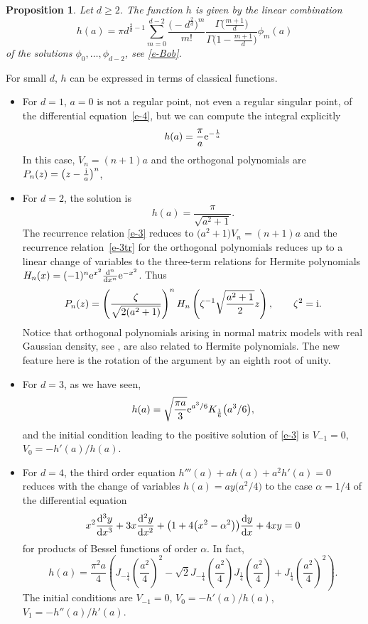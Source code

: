 \documentclass[pdftex]{sigma}
\numberwithin{equation}{section}
\newtheorem{Proposition}[Theorem]{Proposition}
\theoremstyle{definition}
\begin{document}
\begin{Proposition} Let $d\geq2$. The function $h$ is given by the linear combination
\[
 h(a)=\pi d^{\frac2d-1}\sum_{m=0}^{d-2}\frac{\bigl(-d^{\frac2d}\bigr)^m}{m!}
 \frac{\Gamma\bigl(\frac{m+1}d\bigr)}
 {\Gamma\bigl(1-\frac{m+1}{d}\bigr)}\phi_m(a)
\]
of the solutions $\phi_0,\dots,\phi_{d-2}$, see \eqref{e-Bob}.
\end{Proposition}
For small $d$, $h$ can be expressed in terms of classical functions.
\begin{itemize}\itemsep=0pt
 \item
 For $d=1$, $a=0$ is not a regular point, not even a regular singular point, of the
 differential equation~\eqref{e-4}, but we can compute the integral explicitly
\[
h(a)=\frac{\pi}a{\rm e}^{-\frac1a}
\]
In this case, $V_n=(n+1)a$ and the orthogonal polynomials are $P_n(z)=\left(z-\frac {\rm i}a\right)^n$,
\item
For $d=2$, the solution is
\[
h(a)=\frac\pi{\sqrt{a^2+1}}.
\]
The recurrence relation \eqref{e-3} reduces to $\big(a^2+1\big)V_n=(n+1)a$ and the recurrence relation~\eqref{e-3tr} for the orthogonal polynomials reduces up to a linear change of variables to the three-term relations for Hermite polynomials $H_{n}(x)=(-1)^n{\rm e}^{x^2}\frac{{\rm d}^n}{{\rm d}x^n}{\rm e}^{-x^2}$. Thus
\[
P_n(z)=\left(\frac\zeta{\sqrt{2(a^2+1)}}\right)^nH_n\left(\zeta^{-1}\sqrt{\frac {a^2+1}2}z\right),\qquad \zeta^2={\rm i}.
\]
Notice that orthogonal polynomials arising in normal matrix models with real Gaussian density, see \cite{Riser2013}, are also related to Hermite polynomials. The new feature here is the rotation of the argument by an eighth root of unity.
\item
For $d=3$, as we have seen,
\[
 h(a)=\sqrt{\frac {\pi a}3} {\rm e}^{a^3/6}K_{\frac16}\bigl(a^3/6\bigr),
\]
and the initial condition leading to the positive solution of \eqref{e-3} is $V_{-1}=0$, $V_{0}=-h'(a)/h(a)$.
\item
 For $d=4$, the third order equation $h'''(a)+ah(a)+a^2h'(a)=0$ reduces with the
 change of variables $h(a)=ay\bigl(a^2/4\bigr)$ to the case $\alpha=1/4$ of the differential equation
 \[
 x^2\frac{{\rm d}^3y}{{\rm d}x^3}+3x\frac{{\rm d}^2y}{{\rm d}x^2}+\bigl(1+4\bigl(x^2-\alpha^2\bigr)\bigr)\frac{{\rm d}y}{{\rm d}x}+4x y=0
 \]
 for products of Bessel functions of order $\alpha$. In fact,
\[
 h(a)=\frac{\pi^2a}4\left(J_{-\frac14}\left({\frac{a^2}4}\right)^2
 -\sqrt2J_{-\frac14}\left({\frac{a^2}4}\right)J_{\frac14}\left({\frac{a^2}4}\right)
 +J_{\frac14}\left({\frac{a^2}4}\right)^2
 \right).
\]
The initial conditions are $V_{-1}=0$, $V_0=-h'(a)/h(a)$, $V_1=-h''(a)/h'(a)$.
\end{itemize}
\end{document}
